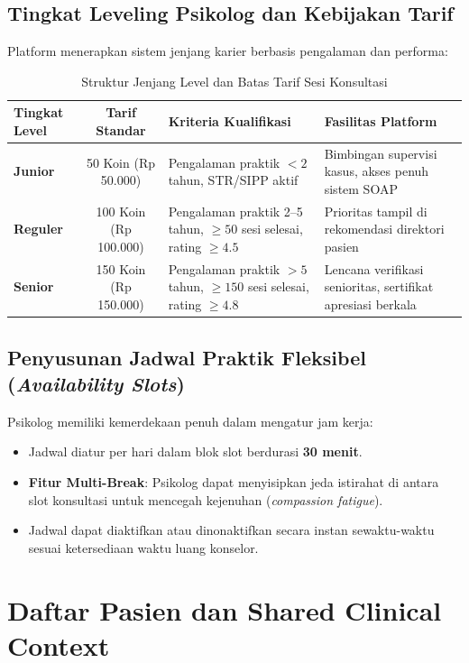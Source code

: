 \subsection{Tingkat Leveling Psikolog dan Kebijakan Tarif}
Platform menerapkan sistem jenjang karier berbasis pengalaman dan performa:
\begin{table}[htbp]
  \centering
  \caption{Struktur Jenjang Level dan Batas Tarif Sesi Konsultasi}
  \label{tab:counselor-levels}
  \small
  \begin{tabularx}{\textwidth}{@{}lcp{5.2cm}X@{}}
    \toprule
    \textbf{Tingkat Level} & \textbf{Tarif Standar} & \textbf{Kriteria Kualifikasi} & \textbf{Fasilitas Platform} \\
    \midrule
    \textbf{Junior} & 50 Koin (Rp 50.000) & Pengalaman praktik $<2$ tahun, STR/SIPP aktif & Bimbingan supervisi kasus, akses penuh sistem SOAP \\
    \textbf{Reguler} & 100 Koin (Rp 100.000) & Pengalaman praktik 2--5 tahun, $\ge 50$ sesi selesai, rating $\ge 4.5$ & Prioritas tampil di rekomendasi direktori pasien \\
    \textbf{Senior} & 150 Koin (Rp 150.000) & Pengalaman praktik $>5$ tahun, $\ge 150$ sesi selesai, rating $\ge 4.8$ & Lencana verifikasi senioritas, sertifikat apresiasi berkala \\
    \bottomrule
  \end{tabularx}
\end{table}

\subsection{Penyusunan Jadwal Praktik Fleksibel (\textit{Availability Slots})}
Psikolog memiliki kemerdekaan penuh dalam mengatur jam kerja:
\begin{itemize}[leftmargin=1.4em]
  \item Jadwal diatur per hari dalam blok slot berdurasi \textbf{30 menit}.
  \item \textbf{Fitur Multi-Break}: Psikolog dapat menyisipkan jeda istirahat di antara slot konsultasi untuk mencegah kejenuhan (\textit{compassion fatigue}).
  \item Jadwal dapat diaktifkan atau dinonaktifkan secara instan sewaktu-waktu sesuai ketersediaan waktu luang konselor.
\end{itemize}

\section{Daftar Pasien dan Shared Clinical Context}

